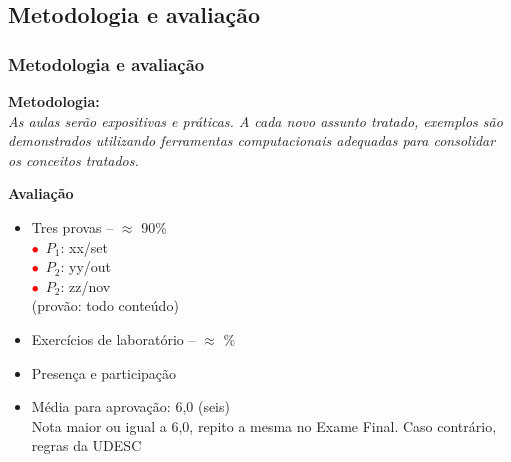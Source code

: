 
\subsection{Metodologia e avaliação}  

\begin{frame}[allowframebreaks=0.9]

\frametitle{Metodologia e avaliação}

\textbf{Metodologia:} \\

\textit{As aulas serão expositivas e práticas. A cada novo assunto tratado, exemplos 
 são demonstrados utilizando ferramentas computacionais adequadas para consolidar os conceitos 
 tratados. 
 }


\newpage
    \textbf{Avaliação}

    \begin{itemize}
    \item Tres provas -- $\approx$  90\%\\
      
	\quad \textcolor{red}{$\bullet$}~$P_1$: xx/set\\
	\quad \textcolor{red}{$\bullet$}~$P_2$: yy/out\\
	\quad \textcolor{red}{$\bullet$}~$P_2$: zz/nov\\(provão: todo conteúdo)


      \item Exercícios de laboratório  -- $\approx$ \%
      


 
      \item Presença e participação
      
      \item Média para aprovação: 6,0 (seis)\\
      Nota maior ou igual a 6,0, repito a mesma no Exame Final. Caso contrário, regras da UDESC
      
    \end{itemize}

\end{frame}



